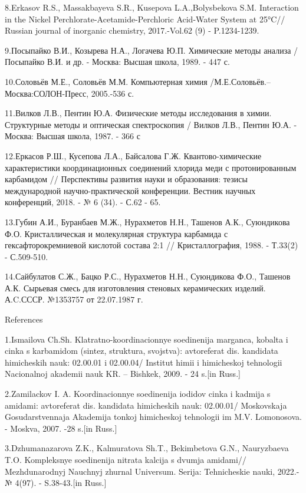 8.Erkasov R.S., Massakbayeva S.R., Kusepova L.A.,Bolysbekova S.M.
Interaction in the Nickel Perchlorate-Acetamide-Perchloric Acid-Water
System at 25°C// Russian journal of inorganic chemistry, 2017.-Vol.62
(9) - P.1234-1239.

9.Посыпайко В.И., Козырева Н.А., Логачева Ю.П. Химические методы анализа
/ Посыпайко В.И. и др. - Москва: Высшая школа, 1989. - 447 с.

10.Соловьёв М.Е., Соловьёв М.М. Компьютерная химия
/М.Е.Соловьёв.--Москва:СОЛОН-Пресс, 2005.-536 с.

11.Вилков Л.В., Пентин Ю.А. Физические методы исследования в химии.
Структурные методы и оптическая спектроскопия / Вилков Л.В., Пентин Ю.А.
- Москва: Высшая школа, 1987. - 366 с

12.Еркасов Р.Ш., Кусепова Л.А., Байсалова Г.Ж. Квантово-химические
характеристики координационных соединений хлорида меди с протонированным
карбамидом // Перспективы развития науки и образования: тезисы
международной научно-практической конференции. Вестник научных
конференций, 2018. - № 6 (34). - С.62 - 65.

13.Губин А.И., Буранбаев М.Ж., Нурахметов Н.Н., Ташенов А.К., Суюндикова
Ф.О. Кристаллическая и молекулярная структура карбамида с
гексафторокремниевой кислотой состава 2:1 // Кристаллография, 1988. -
Т.33(2) - С.509-510.

14.Сайбулатов С.Ж., Бацко Р.С., Нурахметов Н.Н., Суюндикова Ф.О.,
Ташенов А.К. Сырьевая смесь для изготовления стеновых керамических
изделий. А.C.СССР. №1353757 от 22.07.1987 г.

References

1.Ismailova Ch.Sh. Klatratno-koordinacionnye soedinenija marganca,
kobal\textquotesingle ta i cinka s karbamidom (sintez, struktura,
svojstva): avtoreferat dis. kandidata himicheskih nauk: 02.00.01 i
02.00.04/ Institut himii i himicheskoj tehnologii
Nacional\textquotesingle noj akademii nauk KR. -- Bishkek, 2009. - 24
s.{[}in Russ.{]}

2.Zamilackov I. A. Koordinacionnye soedinenija iodidov cinka i kadmija s
amidami: avtoreferat dis. kandidata himicheskih nauk: 02.00.01/
Moskovskaja Gosudarstvennaja Akademija tonkoj himicheskoj tehnologii im
M.V. Lomonosova. - Moskva, 2007. -28 s.{[}in Russ.{]}

3.Dzhumanazarova Z.K., Kalmuratova Sh.T., Bekimbetova G.N., Nauryzbaeva
T.O. Kompleksnye soedinenija nitrata kal\textquotesingle cija s dvumja
amidami// Mezhdunarodnyj Nauchnyj zhurnal Universum. Serija:
Tehnicheskie nauki, 2022.-№ 4(97). - S.38-43.{[}in Russ.{]}


